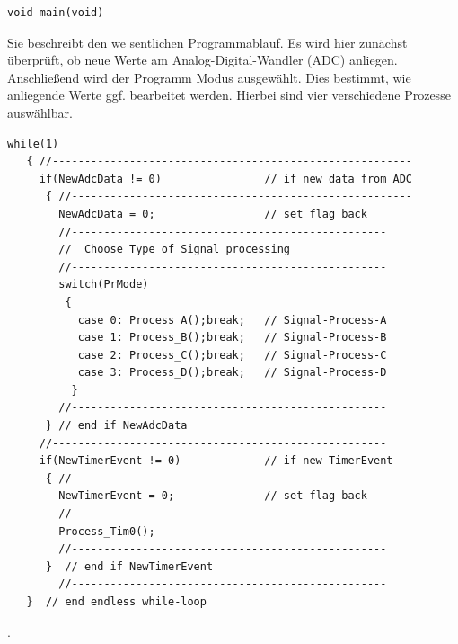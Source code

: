 \documentclass[a4paper,12pt,fontsize=12,DIV=12]{scrartcl}
\begin{document}
\begin{lstlisting}
void main(void)
\end{lstlisting}
Sie beschreibt den we
sentlichen Programmablauf. Es wird hier zunächst überprüft, ob neue Werte am Analog-Digital-Wandler (ADC) anliegen. Anschließend wird der Programm Modus ausgewählt. Dies bestimmt, wie anliegende Werte ggf. bearbeitet werden. Hierbei sind vier verschiedene Prozesse auswählbar.


\begin{lstlisting}[title=Endlosschleife in Main.c]
   while(1)
   { //--------------------------------------------------------
     if(NewAdcData != 0)                // if new data from ADC
      { //-----------------------------------------------------
        NewAdcData = 0;                 // set flag back   
        //-------------------------------------------------
        //  Choose Type of Signal processing                 
        //-------------------------------------------------
        switch(PrMode) 
         {
           case 0: Process_A();break;   // Signal-Process-A
           case 1: Process_B();break;   // Signal-Process-B
           case 2: Process_C();break;   // Signal-Process-C
           case 3: Process_D();break;   // Signal-Process-D
          }
        //-------------------------------------------------
      } // end if NewAdcData
     //----------------------------------------------------
     if(NewTimerEvent != 0)             // if new TimerEvent
      { //-------------------------------------------------
        NewTimerEvent = 0;              // set flag back    
        //-------------------------------------------------
        Process_Tim0();
        //-------------------------------------------------
      }  // end if NewTimerEvent
        //-------------------------------------------------
   }  // end endless while-loop
\end{lstlisting}%
.
\\
\end{document}

